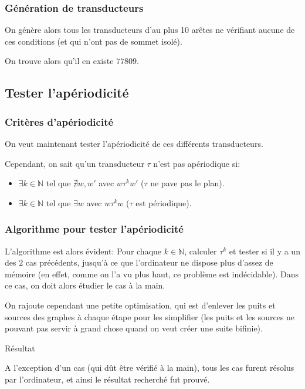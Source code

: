 \documentclass{beamer}
\newcommand{\N}{\mathbb N}
\begin{document}
\begin{frame}
\frametitle{Génération de transducteurs}

On génère alors tous les transducteurs d'au plus 10 arêtes ne vérifiant aucune de ces conditions (et qui n'ont pas de sommet isolé).

On trouve alors qu'il en existe $77809$.

\end{frame}

\subsection{Tester l'apériodicité}

\begin{frame}
\frametitle{Critères d'apériodicité}

On veut maintenant tester l'apériodicité de ces différents transducteurs.

Cependant, on sait qu'un transducteur $\tau$ n'est pas apériodique si:

\begin{itemize}
    \item $\exists k \in \N$ tel que $\nexists w,w'$ avec $w \tau^k w'$ ($\tau$ ne pave pas le plan).
    \item $\exists k \in \N$ tel que $\exists w$ avec $w \tau^k w$ ($\tau$ est périodique).
\end{itemize}
    
\end{frame}

\begin{frame}
\frametitle{Algorithme pour tester l'apériodicité}

L'algorithme est alors évident: Pour chaque $k \in \N$, calculer $\tau^k$ et tester si il y a un des $2$ cas précédents,
jusqu'à ce que l'ordinateur ne dispose plus d'assez de mémoire (en effet, comme on l'a vu plus haut, ce problème est indécidable).
Dans ce cas, on doit alors étudier le cas à la main.

On rajoute cependant une petite optimisation, qui est d'enlever les puits et sources des graphes à chaque étape pour les simplifier
(les puits et les sources ne pouvant pas servir à grand chose quand on veut créer une suite bifinie).

\begin{block}{Résultat}

A l'exception d'un cas (qui dût être vérifié à la main), tous les cas furent résolus par l'ordinateur, et ainsi le résultat recherché fut prouvé.
    
\end{block}

\end{frame}
\end{document}
